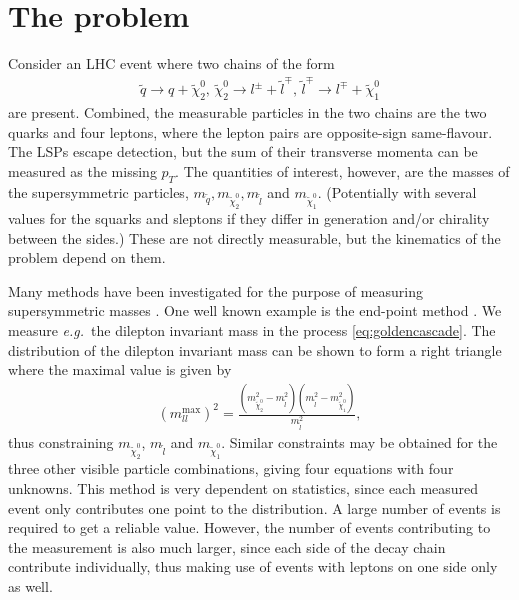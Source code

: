 \documentclass[twoside,english]{uiofysmaster}
\begin{document}
\section{The problem}
Consider an LHC event where two chains of the form
\begin{align}
	\tilde{q} \to q + \tilde{\chi}_2^0, \, \tilde{\chi}_2^0 \to l^{\pm} + \tilde{l}^\mp, \, \tilde{l}^\mp \to l^\mp + \tilde{\chi}_1^0\label{eq:goldencascade}
\end{align}
are present. Combined, the measurable particles in the two chains are the two quarks and four leptons, where the lepton pairs are opposite-sign same-flavour. The LSPs escape detection, but the sum of their transverse momenta can be measured as the missing $p_T$. The quantities of interest, however, are the masses of the supersymmetric particles, $m_{\tilde{q}}, m_{\tilde{\chi}_2^0}, m_{\tilde{l}}$ and $m_{\tilde{\chi}_1^0}$. (Potentially with several values for the squarks and sleptons if they differ in generation and/or chirality between the sides.) These are not directly measurable, but the kinematics of the problem depend on them. 

Many methods have been investigated for the purpose of measuring supersymmetric masses \cite{Barr:2010zj}. One well known example is the end-point method \cite{1126-6708-2000-09-004}. We measure {\it e.g.}\ the dilepton invariant mass in the process \eqref{eq:goldencascade}. The distribution of the dilepton invariant mass can be shown to form a right triangle where the maximal value is given by
\begin{align}
	(m_{ll}^\mathrm{max})^2 = \frac{ \left( m^2_{\tilde{\chi}_2^0} - m^2_{\tilde{l}} \right) \left( m^2_{\tilde{l}} - m^2_{\tilde{\chi}_1^0} \right)}{m^2_{\tilde{l}}}, \label{eq:invariant_mass_endpoint}
\end{align}
thus constraining $m_{\tilde{\chi}_2^0}$, $m_{\tilde{l}}$ and $m_{\tilde{\chi}_1^0}$. Similar constraints may be obtained for the three other visible particle combinations, giving four equations with four unknowns. This method is very dependent on statistics, since each measured event only contributes one point to the distribution. A large number of events is required to get a reliable value. However, the number of events contributing to the measurement is also much larger, since each side of the decay chain contribute individually, thus making use of events with leptons on one side only as well.
\end{document}
